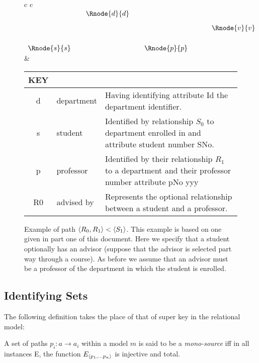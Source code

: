 \documentclass[10pt,a4paper]{article}
\newcommand{\genericmodel}{\mathcal{M}}
\renewcommand{\genericmodel}{{m}}
\newcommand{\term}[1]{\textit{{#1}}}
\newcommand{\ntuple}[1]{\tuple{#1_1,...#1_n}}
\newcommand {\pntuple}{\ensuremath{\ntuple{p}}}
\begin{document}
\begin{figure} [h]  %
\begin{center}
\begin{tabular}{c c}
$
\begin{array}{cp{0.05cm}c  p{0.05cm}c p{0.5cm}c}
                & & \Rnode{d}{d} & &              & &             \\ [0.3cm]
								& &              & &              & & \Rnode{v}{v} \\ [0.6cm]     
	 \Rnode{s}{s} & &              & & \Rnode{p}{p} & &             
\end{array}
$
\idcomp
{} 
\idcomp
{} 
\idcomp
{} 
\idcomp
{} 
\idcomp
& \footnotesize
\begin{tabular}{c p{1.5cm} p{4cm}}
KEY && \\
\hline
d & department & Having identifying attribute Id the department identifier. \\
s & student & Identified by relationship $S_0$ to department enrolled in and  attribute student number SNo. \\
p & professor & Identified by their relationship $R_1$ to a department and their professor number attribute pNo yyy \\
R0 & advised by & Represents the optional relationship between a student and a professor.\\
\end{tabular} 
\end{tabular}
\end{center}
\caption{Example of path  $\langle R_0,R_1\rangle < \langle S_1\rangle$. This example is based on one given in part one of this document. Here we specify that a student optionally has an advisor (suppose that the advisor is selected part way through a course). As before we assume that an advisor must be a professor of the department in which the student is enrolled. }
\label{studentadvisorgraph}
\end{figure}


\subsection{Identifying Sets}

The following definition takes the place of that of super key in the relational model:
\begin{definition}
A set of paths $p_i: a \rightarrow a_i$ within a model $\genericmodel$ is said to be a \term{mono-source} iff in all instances E, the  function $E_{\pntuple}$  is  injective and total.
\end{definition}
\end{document}
